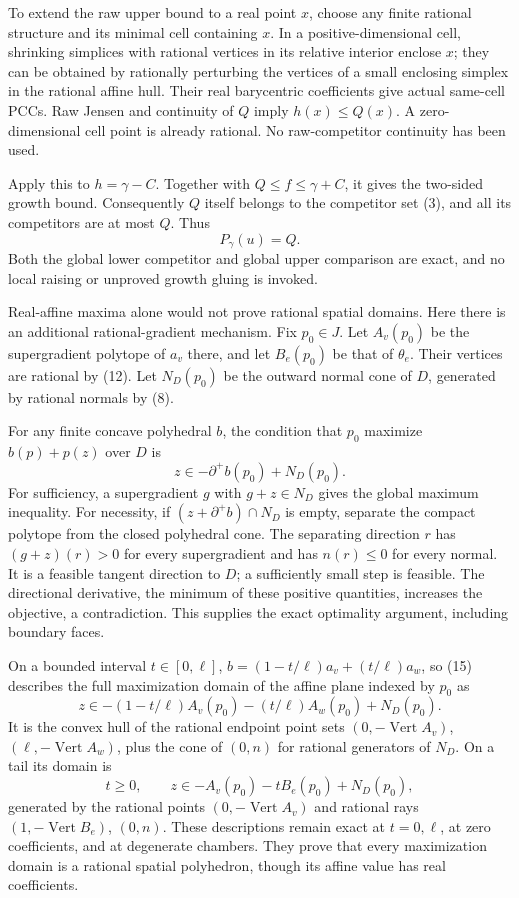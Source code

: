\documentclass[
  11pt,
]{article}
\begin{document}
To extend the raw upper bound to a real point \(x\), choose any finite
rational structure and its minimal cell containing \(x\). In a
positive-dimensional cell, shrinking simplices with rational vertices in
its relative interior enclose \(x\); they can be obtained by rationally
perturbing the vertices of a small enclosing simplex in the rational
affine hull. Their real barycentric coefficients give actual same-cell
PCCs. Raw Jensen and continuity of \(Q\) imply \(h(x)\leq Q(x)\). A
zero-dimensional cell point is already rational. No raw-competitor
continuity has been used.

Apply this to \(h=\gamma-C\). Together with \(Q\leq f\leq\gamma+C\), it
gives the two-sided growth bound. Consequently \(Q\) itself belongs to
the competitor set (3), and all its competitors are at most \(Q\). Thus
\[
                        P_\gamma(u)=Q.                                  \tag{14}
\] Both the global lower competitor and global upper comparison are
exact, and no local raising or unproved growth gluing is invoked.

Real-affine maxima alone would not prove rational spatial domains. Here
there is an additional rational-gradient mechanism. Fix \(p_0\in J\).
Let \(A_v(p_0)\) be the supergradient polytope of \(a_v\) there, and let
\(B_e(p_0)\) be that of \(\theta_e\). Their vertices are rational by
(12). Let \(N_D(p_0)\) be the outward normal cone of \(D\), generated by
rational normals by (8).

For any finite concave polyhedral \(b\), the condition that \(p_0\)
maximize \(b(p)+p(z)\) over \(D\) is \[
                    z\in-\partial^+b(p_0)+N_D(p_0).                      \tag{15}
\] For sufficiency, a supergradient \(g\) with \(g+z\in N_D\) gives the
global maximum inequality. For necessity, if \((z+\partial^+b)\cap N_D\)
is empty, separate the compact polytope from the closed polyhedral cone.
The separating direction \(r\) has \((g+z)(r)>0\) for every
supergradient and has \(n(r)\leq0\) for every normal. It is a feasible
tangent direction to \(D\); a sufficiently small step is feasible. The
directional derivative, the minimum of these positive quantities,
increases the objective, a contradiction. This supplies the exact
optimality argument, including boundary faces.

On a bounded interval \(t\in[0,\ell]\), \(b=(1-t/\ell)a_v+(t/\ell)a_w\),
so (15) describes the full maximization domain of the affine plane
indexed by \(p_0\) as \[
 z\in-(1-t/\ell)A_v(p_0)-(t/\ell)A_w(p_0)+N_D(p_0).                       \tag{16}
\] It is the convex hull of the rational endpoint point sets
\((0,-\operatorname{Vert}A_v)\), \((\ell,-\operatorname{Vert}A_w)\),
plus the cone of \((0,n)\) for rational generators of \(N_D\). On a tail
its domain is \[
 t\geq0,\qquad z\in-A_v(p_0)-tB_e(p_0)+N_D(p_0),                         \tag{17}
\] generated by the rational points \((0,-\operatorname{Vert}A_v)\) and
rational rays \((1,-\operatorname{Vert}B_e)\), \((0,n)\). These
descriptions remain exact at \(t=0,\ell\), at zero coefficients, and at
degenerate chambers. They prove that every maximization domain is a
rational spatial polyhedron, though its affine value has real
coefficients.
\end{document}
